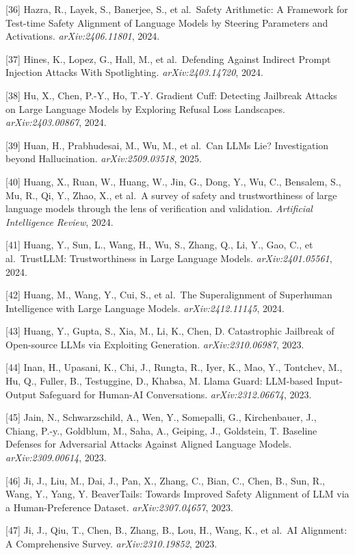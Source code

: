 {[}36{]} Hazra, R., Layek, S., Banerjee, S., et al.~Safety Arithmetic: A Framework for Test-time Safety Alignment of Language Models by Steering Parameters and Activations. \emph{arXiv:2406.11801}, 2024.

{[}37{]} Hines, K., Lopez, G., Hall, M., et al.~Defending Against Indirect Prompt Injection Attacks With Spotlighting. \emph{arXiv:2403.14720}, 2024.

{[}38{]} Hu, X., Chen, P.-Y., Ho, T.-Y. Gradient Cuff: Detecting Jailbreak Attacks on Large Language Models by Exploring Refusal Loss Landscapes. \emph{arXiv:2403.00867}, 2024.

{[}39{]} Huan, H., Prabhudesai, M., Wu, M., et al.~Can LLMs Lie? Investigation beyond Hallucination. \emph{arXiv:2509.03518}, 2025.

{[}40{]} Huang, X., Ruan, W., Huang, W., Jin, G., Dong, Y., Wu, C., Bensalem, S., Mu, R., Qi, Y., Zhao, X., et al.~A survey of safety and trustworthiness of large language models through the lens of verification and validation. \emph{Artificial Intelligence Review}, 2024.

{[}41{]} Huang, Y., Sun, L., Wang, H., Wu, S., Zhang, Q., Li, Y., Gao, C., et al.~TrustLLM: Trustworthiness in Large Language Models. \emph{arXiv:2401.05561}, 2024.

{[}42{]} Huang, M., Wang, Y., Cui, S., et al.~The Superalignment of Superhuman Intelligence with Large Language Models. \emph{arXiv:2412.11145}, 2024.

{[}43{]} Huang, Y., Gupta, S., Xia, M., Li, K., Chen, D. Catastrophic Jailbreak of Open-source LLMs via Exploiting Generation. \emph{arXiv:2310.06987}, 2023.

{[}44{]} Inan, H., Upasani, K., Chi, J., Rungta, R., Iyer, K., Mao, Y., Tontchev, M., Hu, Q., Fuller, B., Testuggine, D., Khabsa, M. Llama Guard: LLM-based Input-Output Safeguard for Human-AI Conversations. \emph{arXiv:2312.06674}, 2023.

{[}45{]} Jain, N., Schwarzschild, A., Wen, Y., Somepalli, G., Kirchenbauer, J., Chiang, P.-y., Goldblum, M., Saha, A., Geiping, J., Goldstein, T. Baseline Defenses for Adversarial Attacks Against Aligned Language Models. \emph{arXiv:2309.00614}, 2023.

{[}46{]} Ji, J., Liu, M., Dai, J., Pan, X., Zhang, C., Bian, C., Chen, B., Sun, R., Wang, Y., Yang, Y. BeaverTails: Towards Improved Safety Alignment of LLM via a Human-Preference Dataset. \emph{arXiv:2307.04657}, 2023.

{[}47{]} Ji, J., Qiu, T., Chen, B., Zhang, B., Lou, H., Wang, K., et al.~AI Alignment: A Comprehensive Survey. \emph{arXiv:2310.19852}, 2023.

